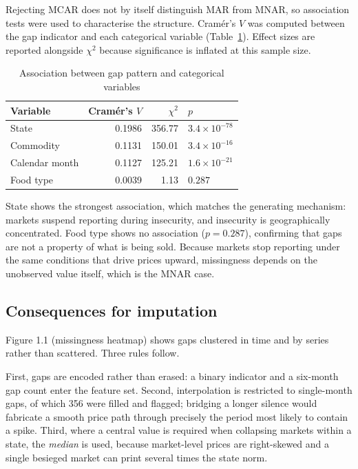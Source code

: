 \documentclass[conference]{IEEEtran}
\begin{document}
Rejecting MCAR does not by itself distinguish MAR from MNAR, so association
tests were used to characterise the structure. Cram\'{e}r's $V$ was computed
between the gap indicator and each categorical variable
(Table~\ref{tab:cramers}). Effect sizes are reported alongside $\chi^2$ because
significance is inflated at this sample size.

\begin{table}[htbp]
\caption{Association between gap pattern and categorical variables}
\begin{center}
\begin{tabular}{@{}lrrl@{}}
\toprule
\textbf{Variable} & \textbf{Cram\'{e}r's $V$} & \textbf{$\chi^2$} & \textbf{$p$} \\
\midrule
State & 0.1986 & 356.77 & $3.4\times10^{-78}$ \\
Commodity & 0.1131 & 150.01 & $3.4\times10^{-16}$ \\
Calendar month & 0.1127 & 125.21 & $1.6\times10^{-21}$ \\
Food type & 0.0039 & 1.13 & $0.287$ \\
\bottomrule
\end{tabular}
\label{tab:cramers}
\end{center}
\end{table}

State shows the strongest association, which matches the generating mechanism:
markets suspend reporting during insecurity, and insecurity is
geographically concentrated. Food type shows no association ($p = 0.287$),
confirming that gaps are not a property of what is being sold. Because markets
stop reporting under the same conditions that drive prices upward, missingness
depends on the unobserved value itself, which is the MNAR case.

\subsection{Consequences for imputation}

Figure 1.1 (missingness heatmap) shows gaps clustered in time and by series
rather than scattered. Three rules follow.

First, gaps are encoded rather than erased: a binary indicator and a six-month
gap count enter the feature set. Second, interpolation is restricted to
single-month gaps, of which 356 were filled and flagged; bridging a longer
silence would fabricate a smooth price path through precisely the period most
likely to contain a spike. Third, where a central value is required when
collapsing markets within a state, the \emph{median} is used, because
market-level prices are right-skewed and a single besieged market can print
several times the state norm.
\end{document}
